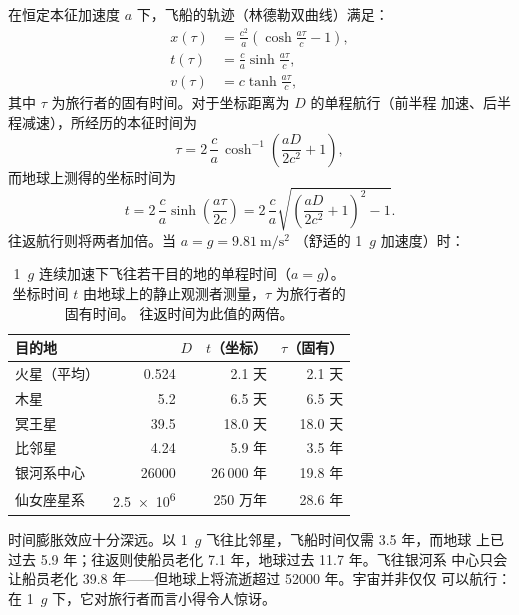 \documentclass[12pt,a4paper]{article}
\newcommand{\AU}{\,\text{AU}}
\newcommand{\ly}{\,\text{光年}}
\begin{document}
在恒定本征加速度 $a$ 下，飞船的轨迹（林德勒双曲线）满足：
\begin{align}
  x(\tau) &= \frac{c^2}{a}\!\left(\cosh\frac{a\tau}{c} - 1\right),\\
  t(\tau)  &= \frac{c}{a}\sinh\frac{a\tau}{c},\\
  v(\tau)  &= c\tanh\frac{a\tau}{c},
\end{align}
其中 $\tau$ 为旅行者的固有时间。对于坐标距离为 $D$ 的单程航行（前半程
加速、后半程减速），所经历的本征时间为
\begin{equation}
  \tau = 2\,\frac{c}{a}\,\cosh^{-1}\!\!\left(\frac{aD}{2c^2}+1\right),
  \label{eq:oneway_proper_zh}
\end{equation}
而地球上测得的坐标时间为
\begin{equation}
  t = 2\,\frac{c}{a}\sinh\!\left(\frac{a\tau}{2c}\right)
    = 2\,\frac{c}{a}\sqrt{\left(\frac{aD}{2c^{2}}+1\right)^{2}-1}.
  \label{eq:oneway_coord_zh}
\end{equation}
往返航行则将两者加倍。当 $a = g = \SI{9.81}{\meter\per\second\squared}$
（舒适的 1~$g$ 加速度）时：

\begin{table}[ht]
  \centering
  \caption{1~$g$ 连续加速下飞往若干目的地的单程时间（$a=g$）。
   坐标时间 $t$ 由地球上的静止观测者测量，$\tau$ 为旅行者的固有时间。
   往返时间为此值的两倍。}
  \label{tab:rel_trips_zh}
  \begin{tabularx}{\textwidth}{X r r r}
    \toprule
    目的地 & $D$ & $t$（坐标） & $\tau$（固有） \\
    \midrule
    火星（平均）        & \SI{0.524}{\AU} & 2.1 天        & 2.1 天        \\
    木星                & \SI{5.2}{\AU}   & 6.5 天        & 6.5 天        \\
    冥王星              & \SI{39.5}{\AU}  & 18.0 天       & 18.0 天       \\
    比邻星              & \SI{4.24}{\ly}  & 5.9 年        & 3.5 年        \\
    银河系中心          & \SI{26000}{\ly} & 26\,000 年    & 19.8 年       \\
    仙女座星系          & \SI{2.5e6}{\ly} & 250 万年      & 28.6 年       \\
    \bottomrule
  \end{tabularx}
\end{table}

时间膨胀效应十分深远。以 1~$g$ 飞往比邻星，飞船时间仅需 3.5 年，而地球
上已过去 5.9 年；往返则使船员老化 7.1 年，地球过去 11.7 年。飞往银河系
中心只会让船员老化 39.8 年——但地球上将流逝超过 52000 年。宇宙并非仅仅
可以航行：在 1~$g$ 下，它对旅行者而言小得令人惊讶。
\end{document}
